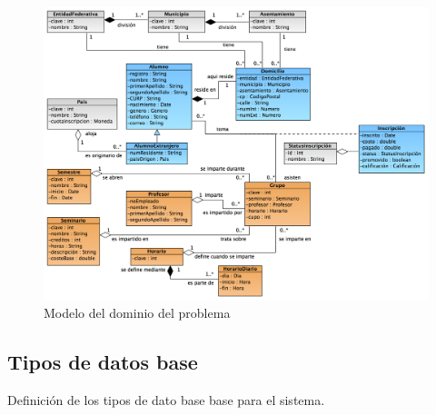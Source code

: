 \documentclass[10pt]{book}
\begin{document}
\begin{figure}[htbp!]
	\begin{center}
		\includegraphics[angle=90,width=.95\textwidth]{images/modeloDelDominioDelProblema}
		\caption{Modelo del dominio del problema}
		\label{fig:modeloDeDominio}
	\end{center}
\end{figure}

\subsection{Tipos de datos base}

	Definición de los tipos de dato base base para el sistema.
\end{document}
